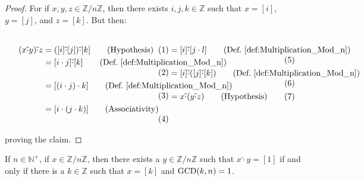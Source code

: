     \begin{proof}
        For if $x,y,z\in\mathbb{Z}/n\mathbb{Z}$, then there exists
        $i,j,k\in\mathbb{Z}$ such that $x=[i]$, $y=[j]$, and $z=[k]$.
        But then:
        \par
        \begin{subequations}
            \begin{minipage}[t]{0.54\textwidth}
                \centering
                \begin{align}
                    (x\tilde{\cdot}y)\tilde{\cdot}z
                    &=([i]\tilde{\cdot}[j])\tilde{\cdot}[k]
                        \tag{Hypothesis}\\
                    &=[i\cdot{j}]\tilde{\cdot}[k]
                        \tag{Def.~\ref{def:Multiplication_Mod_n}}\\
                    &=[(i\cdot{j})\cdot{k}]
                        \tag{Def.~\ref{def:Multiplication_Mod_n}}\\
                    &=[i\cdot(j\cdot{k})]
                        \tag{Associativity}
                \end{align}
            \end{minipage}
            \hfill
            \begin{minipage}[t]{0.44\textwidth}
                \begin{align}
                    &=[i]\tilde{\cdot}[j\cdot{l}]
                        \tag{Def.~\ref{def:Multiplication_Mod_n}}\\
                    &=[i]\tilde{\cdot}([j]\tilde{\cdot}[k])
                        \tag{Def.~\ref{def:Multiplication_Mod_n}}\\
                    &=x\tilde{\cdot}(y\tilde{\cdot}z)
                        \tag{Hypothesis}
                \end{align}
            \end{minipage}
        \end{subequations}
        \par\vspace{2.5ex}
        proving the claim.
    \end{proof}
    \begin{theorem}
        \label{thm:Invertible_Mod_n_iff_Relatively_Prime}%
        If $n\in\mathbb{N}^{+}$, if $x\in\mathbb{Z}/n\mathbb{Z}$, then
        there exists a $y\in\mathbb{Z}/n\mathbb{Z}$ such that
        $x\tilde{\cdot}{y}=[1]$ if and only if there is a
        $k\in\mathbb{Z}$ such that $x=[k]$ and $\mathrm{GCD}(k,n)=1$.
    \end{theorem}
